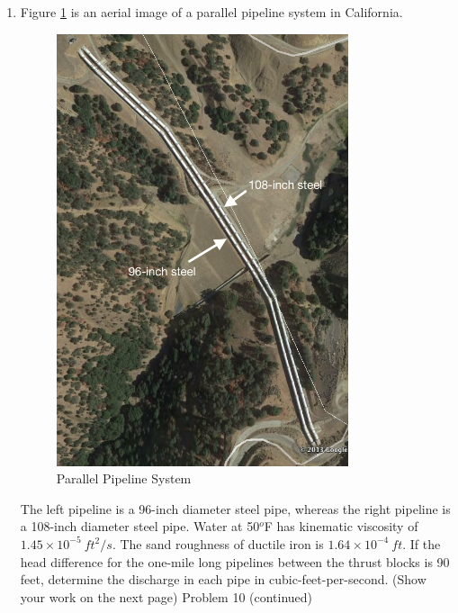 \documentclass[11pt]{article}
\begin{document}
\begin{enumerate}
\clearpage
\item Figure \ref{fig:parallelpipes} is an aerial image of a parallel pipeline system in California.   

\begin{figure}[htbp] %
   \centering
   \includegraphics[height=5in]{parallelpipes.jpg} 
   \caption{Parallel Pipeline System}
   \label{fig:parallelpipes}
\end{figure}

The left pipeline is a 96-inch diameter steel pipe, whereas the right pipeline is a 108-inch diameter steel pipe.  
Water at 50$^o$F has kinematic viscosity of $1.45\times10^{-5}~ft^2/s$.   
The sand roughness of ductile iron is $1.64\times10^{-4}~ft$.   
If the head difference for the one-mile long pipelines between the thrust blocks is 90 feet, determine the discharge in each pipe in cubic-feet-per-second.
(Show your work on the next page)
\clearpage
Problem 10 (continued)
\clearpage


\end{enumerate}
\end{document}
